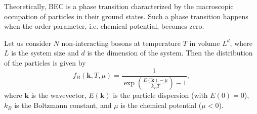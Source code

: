 Theoretically, BEC is a phase transition characterized by the macroscopic occupation of particles in their ground states.
Such a phase transition happens when the order parameter, i.e. chemical potential, becomes zero.

Let us consider $N$ non-interacting bosons at temperature $T$ in volume $L^d$, where $L$ is the system size and $d$ is the dimension of the system.
Then the distribution of the particles is given by
%
\begin{equation}
    f_B\left( \mathbf{k} ,T, \mu \right) = \frac{1}{\exp\left( \frac{E\left( \mathbf{k}\right) -\mu}{k_B T}\right)-1},
    \label{eq:Ch1_BEC_statistics}
\end{equation}
where $\mathbf{k}$ is the wavevector, $E\left( \mathbf{k}\right)$ is the particle dispersion (with $E\left(0\right)=0$), $k_B$ is the Boltzmann constant, and $\mu$ is the chemical potential ($\mu <0$).

